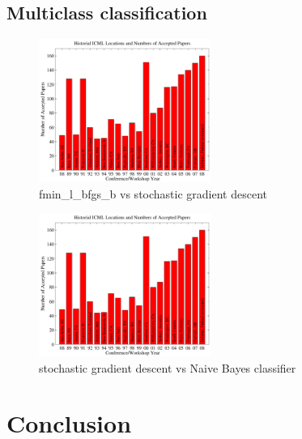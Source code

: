 \documentclass{article}
\begin{document}
\subsection{Multiclass classification}
\begin{figure}[H]
  \caption{fmin\_l\_bfgs\_b vs stochastic gradient descent}
  \centering
    \includegraphics[width=0.5\textwidth]{icml_numpapers}
\end{figure}


\begin{figure}[H]
  \caption{stochastic gradient descent vs Naive Bayes classifier}
  \centering
    \includegraphics[width=0.5\textwidth]{icml_numpapers}
\end{figure}





\section{Conclusion}
\nocite{langley00}



\end{document}
